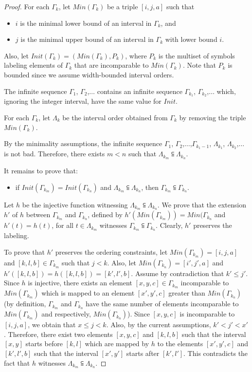 \begin{proof}
For each $\Gamma_k$, let $Min(\Gamma_k)$ be a triple $[i,j,a]$ such that 
\begin{itemize}
	\item $i$ is the minimal lower bound of an interval in $\Gamma_k$, and 
	\item $j$ is the minimal upper bound of an interval in $\Gamma_k$ with lower bound $i$.
\end{itemize}

Also, let $Init(\Gamma_k) = (Min(\Gamma_k), P_k)$, where $P_k$ is the multiset of symbols labeling elements of $\Gamma_k$ that are incomparable to $Min(\Gamma_k)$. Note that $P_k$ is bounded since we assume width-bounded interval orders.

The infinite sequence $\Gamma_1$, $\Gamma_2$,$\ldots$ contains an infinite sequence $\Gamma_{k_1}$, $\Gamma_{k_2}$,$\ldots$ which, ignoring the integer interval, have the same value for $Init$.

For each $\Gamma_k$, let $\Lambda_k$ be the interval order obtained from $\Gamma_k$ by removing the triple $Min(\Gamma_k)$.

By the minimality assumptions, the infinite sequence $\Gamma_1$, $\Gamma_2$,$\ldots$,$\Gamma_{k_1-1}$, $\Lambda_{k_1}$, $\Lambda_{k_2}$,$\ldots$ is not bad. 
Therefore, there exists $m<n$ such that $\Lambda_{k_m}\subseteqq \Lambda_{k_n}$. 

It remains to prove that:
\begin{itemize}
	\item if $Init(\Gamma_{k_m})=Init(\Gamma_{k_n})$ and $\Lambda_{k_m}\subseteqq \Lambda_{k_n}$, then $\Gamma_{k_m}\subseteqq \Gamma_{k_n}$.
\end{itemize}

Let $h$ be the injective function witnessing $\Lambda_{k_m}\subseteqq \Lambda_{k_n}$. We prove that the extension $h'$ of $h$ between $\Gamma_{k_m}$ and $\Gamma_{k_n}$, defined by $h'(Min(\Gamma_{k_m}))=Min(\Gamma_{k_n}$ and $h'(t)=h(t)$, for all $t\in \Lambda_{k_m}$ witnesses $\Gamma_{k_m}\subseteqq \Gamma_{k_n}$. Clearly, $h'$ preserves the labeling. 

To prove that $h'$ preserves the ordering constraints, let $Min(\Gamma_{k_m})=[i,j,a]$ and $[k,l,b]\in \Gamma_{k_m}$ such that $j< k$. Also, let $Min(\Gamma_{k_n})=[i',j',a]$ and $h'([k,l,b])=h([k,l,b])=[k',l',b]$. Assume by contradiction that $k'\leq j'$. Since $h$ is injective, there exists an element $[x,y,c]\in \Gamma_{k_m}$ incomparable to $Min(\Gamma_{k_m})$ which is mapped to an element $[x',y',c]$ greater than $Min(\Gamma_{k_n})$ (by definition, $\Gamma_{k_m}$ and $\Gamma_{k_n}$ have the same number of elements incomparable to $Min(\Gamma_{k_m})$ and respectively, $Min(\Gamma_{k_n})$). 
Since $[x,y,c]$ is incomparable to $[i,j,a]$, we obtain that $x\leq j< k$. Also, by the current assumptions, $k'<j'<x'$. Therefore, there exist two elements $[x,y,c]$ and $[k,l,b]$ such that the interval $[x,y]$ starts before $[k,l]$ which are mapped by $h$ to the elements $[x',y',c]$ and $[k',l',b]$ such that the interval $[x',y']$ starts after $[k',l']$. This contradicts the fact that $h$ witnesses $\Lambda_{k_m}\subseteqq \Lambda_{k_n}$.


\end{proof}
